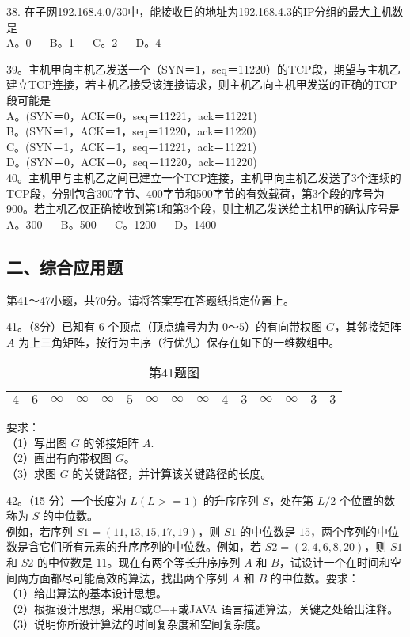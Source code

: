 38. 在子网192.168.4.0/30中，能接收目的地址为192.168.4.3的IP分组的最大主机数是 \\
A。0 $\quad$ B。1 $\quad$ C。2 $\quad$ D。4

39。主机甲向主机乙发送一个（SYN＝1，seq＝11220）的TCP段，期望与主机乙建立TCP连接，若主机乙接受该连接请求，则主机乙向主机甲发送的正确的TCP段可能是 \\
A。(SYN＝0，ACK＝0，seq＝11221，ack＝11221) \\
B。(SYN＝1，ACK＝1，seq＝11220，ack＝11220) \\
C。(SYN＝1，ACK＝1，seq＝11221，ack＝11221) \\
D。(SYN＝0，ACK＝0，seq＝11220，ack＝11220) \\

40。主机甲与主机乙之间已建立一个TCP连接，主机甲向主机乙发送了3个连续的TCP段，分别包含300字节、400字节和500字节的有效载荷，第3个段的序号为900。若主机乙仅正确接收到第1和第3个段，则主机乙发送给主机甲的确认序号是 \\
A。300 $\quad$ B。500 $\quad$ C。1200 $\quad$ D。1400


\subsection{二、综合应用题}
第41～47小题，共70分。请将答案写在答题纸指定位置上。

41。（8分）已知有 $6$ 个顶点（顶点编号为为 $0$～$5$）的有向带权图 $G$，其邻接矩阵 $A$ 为上三角矩阵，按行为主序（行优先）保存在如下的一维数组中。
\begin{table}[ht]
\centering
\caption{第41题图}\label{tab_Na11_1}
\begin{tabular}{|c|c|c|c|c|c|c|c|c|c|c|c|c|c|c|}
\hline
$4$ & $6$ & $\infty$ & $\infty$ & $\infty$ & $5$ & $\infty$ & $\infty$ & $\infty$ & $4$ & $3$ & $\infty$ & $\infty$ & $3$ & $3$ \\
\hline
\end{tabular}
\end{table}
要求：  \\
（1）写出图 $G$ 的邻接矩阵 $A$.  \\
（2）画出有向带权图 $G$。  \\
（3）求图 $G$ 的关键路径，并计算该关键路径的长度。

42。（15 分）一个长度为 $L(L>=1)$ 的升序序列 $S$，处在第 $L/2$ 个位置的数称为 $S$ 的中位数。 \\
例如，若序列 $S1=(11,13,15,17,19)$，则 $S1$ 的中位数是 $15$，两个序列的中位数是含它们所有元素的升序序列的中位数。例如，若 $S2=(2,4,6,8,20)$，则 $S1$ 和 $S2$ 的中位数是 $11$。现在有两个等长升序序列 $A$ 和 $B$，试设计一个在时间和空间两方面都尽可能高效的算法，找出两个序列 $A$ 和 $B$ 的中位数。要求： \\
（1）给出算法的基本设计思想。 \\
（2）根据设计思想，采用C或C++或JAVA 语言描述算法，关键之处给出注释。 \\
（3）说明你所设计算法的时间复杂度和空间复杂度。 \\

